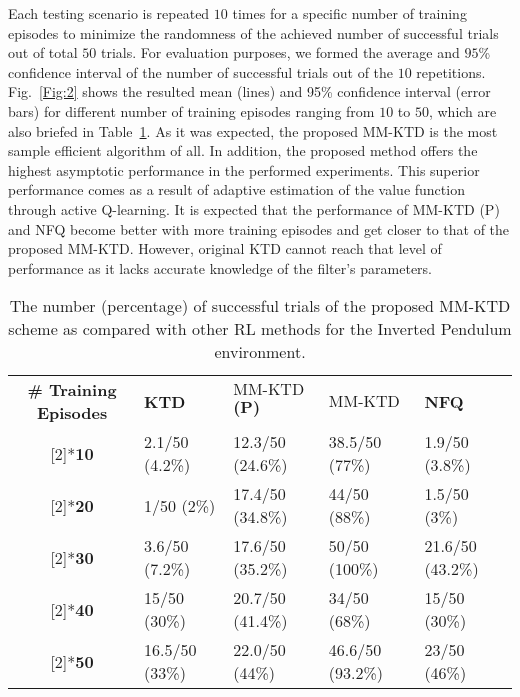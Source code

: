 \documentclass{ieeeaccess}
\def\MMK{\text{MM-KTD}}
\begin{document}
Each testing scenario is repeated $10$ times for a specific number of training episodes to minimize the randomness of the achieved number of successful trials out of total $50$ trials. For evaluation purposes, we formed the average and $95$\% confidence interval of the number of successful trials out of the $10$ repetitions. Fig.~\ref{Fig:2}  shows the resulted mean (lines) and 95\% confidence interval (error bars) for different number of training episodes ranging from $10$ to $50$, which are also briefed in Table~\ref{Table:1}. 
As it was expected, the proposed $\MMK$ is the most sample efficient algorithm of all. In addition, the proposed method offers the highest asymptotic performance in the performed experiments. This superior performance comes as a result of adaptive estimation of the value function through active Q-learning. It is expected that the performance of $\MMK$ (P) and NFQ become better with more training episodes and get closer to that of the proposed $\MMK$. However, original KTD cannot reach that level of performance as it lacks accurate knowledge of the filter's parameters.
\begin{table}[t]
\vspace{-.1in}
\caption{\small The number (percentage) of successful trials of the proposed MM-KTD scheme as compared with other RL methods for the Inverted Pendulum environment.}\label{Table:1}
\centering
\begin{tabular}{|c|p{1cm}|p{1.6cm}|p{1.1cm}|p{1.1cm}|}
\hline
\multirow{2}[2]{*}{\textbf{\!\!\!\# Training Episodes\!\!\!}} & \multirow{2}[2]{*}{\textbf{KTD}} &  \multirow{2}[2]{*}{\textbf{$\MMK$ (P)}} &  \multirow{2}[2]{*}{\textbf{$\MMK$}}&  \multirow{2}[2]{*}{\textbf{NFQ}} \\
&&&&\\
\hline
\!\!\!\multirow{2}[2]{*}{\textbf{10}}\!\!\! & 2.1/50 (4.2\%) &  12.3/50 (24.6\%) &  38.5/50 (77\%) &  1.9/50 (3.8\%) \\
\hline
\!\!\!\multirow{2}[2]{*}{\textbf{20}}\!\!\! & 1/50 (2\%) &  17.4/50 (34.8\%) &  44/50 (88\%) &  1.5/50 (3\%) \\
\hline
\!\!\!\multirow{2}[2]{*}{\textbf{30}}\!\!\! & 3.6/50 (7.2\%) &  17.6/50 (35.2\%) &  50/50 (100\%) & 21.6/50 (43.2\%) \\
\hline
\!\!\!\multirow{2}[2]{*}{\textbf{40}}\!\!\! & 15/50 (30\%) &   20.7/50 (41.4\%) &  34/50 (68\%) & 15/50 (30\%)\\
\hline
\!\!\!\multirow{2}[2]{*}{\textbf{50}}\!\!\! & 16.5/50 (33\%) &   22.0/50 (44\%) &  46.6/50 (93.2\%) & 23/50 (46\%)\\
\hline
\end{tabular}
\end{table}
\end{document}
